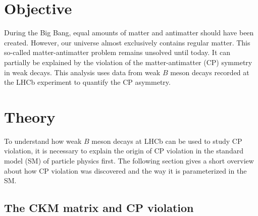 \section{Objective}

During the Big Bang, equal amounts of matter and antimatter should have been created. However, our universe almost exclusively contains regular matter.
This so-called matter-antimatter problem remains unsolved until today. It can partially be explained by the violation of
the matter-antimatter (CP) symmetry in weak decays. This analysis uses data from weak $B$ meson decays recorded at the LHCb experiment to quantify
the CP asymmetry.

\section{Theory}
\label{sec:Theorie}

To understand how weak $B$ meson decays at LHCb can be used to study CP violation, it is necessary to explain the origin of CP violation in the standard model (SM)
of particle physics first. The following section gives a short overview about how CP violation was discovered and the way it is parameterized in the SM.

\subsection{The CKM matrix and CP violation}

